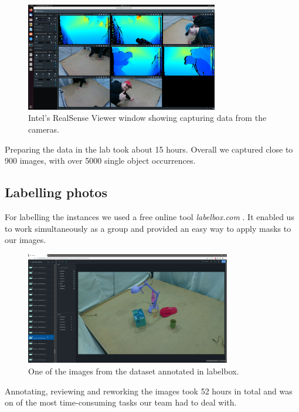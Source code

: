 \begin{figure}[ht]
    \centering
    \includegraphics[width=0.75\textwidth]{img/viewer-screenshot.png}
    \caption{Intel's RealSense Viewer window showing capturing data from the cameras.}
    \label{fig:realsense-viewer}
\end{figure}

Preparing the data in the lab took about 15 hours. Overall we captured close to 900 images, with over 5000 single object occurrences. 

\subsection{Labelling photos}
For labelling the instances we used a free online tool \textit{labelbox.com} \cite{labelbox}. It enabled us to work simultaneously as a group and provided an easy way to apply masks to our images.

\begin{figure}[ht]
    \centering
    \includegraphics[width=0.8\textwidth]{img/labelbox-screenshot.png}
    \caption{One of the images from the dataset annotated in labelbox.}
    \label{fig:labelbox-window}
\end{figure}

Annotating, reviewing and reworking the images took 52 hours in total and was on of the most time-consuming tasks our team had to deal with.

